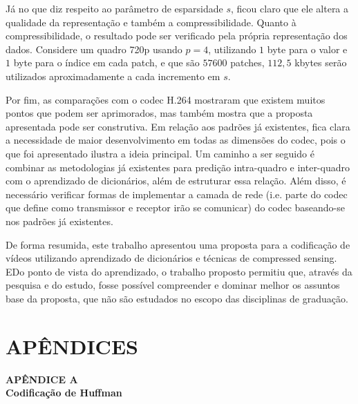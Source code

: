 \documentclass[cic,tc]{iiufrgs}
\begin{document}
Já no que diz respeito ao parâmetro de esparsidade $s$, ficou claro que ele altera a qualidade da representação 
e também a compressibilidade.
Quanto à compressibilidade, o resultado pode ser verificado pela própria representação dos dados.
Considere um quadro 720p usando $p=4$, utilizando $1$ byte para o valor e $1$ byte para o índice em cada 
patch, e que são $57600$ patches, $112,5$ kbytes serão utilizados aproximadamente a cada incremento
em $s$.

Por fim, as comparações com o codec H.264 mostraram que existem muitos pontos que podem ser 
aprimorados, mas também mostra que a proposta apresentada pode ser construtiva.
Em relação aos padrões já existentes, fica clara a necessidade de maior desenvolvimento em 
todas as dimensões do codec, pois o que foi apresentado ilustra a ideia principal.
Um caminho a ser seguido é combinar as metodologias já existentes para predição intra-quadro 
e inter-quadro com o aprendizado de dicionários, além de estruturar essa relação.
Além disso, é necessário verificar formas de implementar a camada de rede 
(i.e. parte do codec que define como transmissor e receptor irão se comunicar) 
do codec baseando-se 
nos padrões já existentes.

De forma resumida, este trabalho apresentou uma proposta para a codificação de vídeos 
utilizando aprendizado de dicionários e técnicas de compressed sensing.
EDo ponto de vista do aprendizado, o trabalho proposto permitiu que, 
através da pesquisa e do estudo, fosse possível compreender e dominar 
melhor os assuntos base da proposta, que não são estudados no escopo das disciplinas de graduação.


% 




\chapter*{APÊNDICES}
{
    \centering
    \textbf{APÊNDICE A} \\
    \textbf{Codificação de Huffman} \par
}
\vspace{1em}
\end{document}
